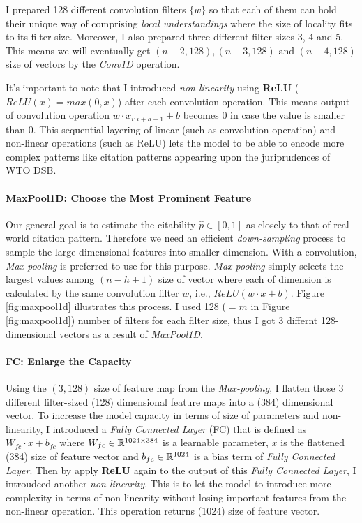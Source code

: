 \documentclass[12pt,letterpaper]{article}
\begin{document}

I prepared 128 different convolution filters $\{w\}$  so that each of them can hold their unique way of comprising \textit{local understandings} where the size of locality fits to its filter size.
Moreover, I also prepared three different filter sizes 3, 4 and 5. This means we will eventually get $(n-2, 128), (n-3, 128) \text{ and } (n-4,128)$ size of vectors by the \textit{Conv1D} operation.

It's important to note that I introduced \textit{non-linearity} using \textbf{ReLU} ($ReLU(x) = max(0, x)$) after each convolution operation.
This means output of convolution operation $w \cdot x_{i:i+h-1} + b$ becomes $0$ in case the value is smaller than $0$.
This sequential layering of linear (such as convolution operation) and non-linear operations (such as ReLU) lets the model to be able to encode
more complex patterns like citation patterns appearing upon the juriprudences of WTO DSB.


\paragraph{MaxPool1D: Choose the Most Prominent Feature}

Our general goal is to estimate the citability $\hat{p} \in [0, 1]$ as closely to that of real world citation pattern.
Therefore we need an efficient \textit{down-sampling} process to sample the large dimensional features into smaller dimension.
With a convolution, \textit{Max-pooling} is preferred to use for this purpose. \textit{Max-pooling} simply selects the largest values among $(n-h+1)$ size of vector where each of dimension is calculated by the same convolution filter $w$, i.e., $ReLU(w \cdot x + b)$.
Figure \ref{fig:maxpool1d} illustrates this process. I used 128 ($=m$ in Figure \ref{fig:maxpool1d}) number of filters for each filter size, thus I got 3 differnt 128-dimensional vectors as a result of \textit{MaxPool1D}.


\paragraph{FC: Enlarge the Capacity}
Using the $(3, 128)$ size of feature map from the \textit{Max-pooling}, I flatten those 3 different filter-sized (128) dimensional feature maps into a (384) dimensional vector.
To increase the model capacity in terms of size of parameters and non-linearity, I introduced a \textit{Fully Connected Layer} (FC) that is defined as $W_{fc} \cdot x + b_{fc}$ where $W_{fc} \in \Bbb R^{1024 \times 384}$ is a learnable parameter, $x$ is the flattened (384) size of feature vector and $b_{fc} \in \Bbb R^{1024}$ is a bias term of \textit{Fully Connected Layer}.
Then by apply \textbf{ReLU} again to the output of this \textit{Fully Connected Layer}, I introudced another \textit{non-linearity}. This is to let the model
to introduce more complexity in terms of non-linearity without losing important features
from the non-linear operation. This operation returns (1024) size of feature vector.
\end{document}
